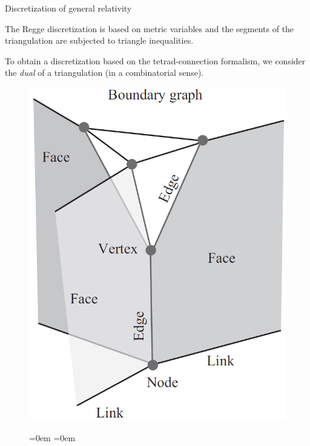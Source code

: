 \documentclass[12pt,titlepage]{article}
\begin{document}
\begin{frame}{Discretization of general relativity}
    \begin{list}{\,}{\leftmargin=1em \itemindent=0em}
        \item<1-> The Regge discretization is based on metric variables and the segments of the triangulation are subjected to triangle inequalities.
        \item<2-> To obtain a discretization based on the tetrad-connection formalism, we consider the \textit{dual} of a triangulation (in a combinatorial sense). 
        \item<3-> \noindent\FloatBarrier
        \begin{figure}[!ht]
            \begin{minipage}{0.3\linewidth}
                \includegraphics[width=\linewidth]{4.6.png}
            \end{minipage}
            \begin{minipage}{0.7\linewidth}
                \begin{itemize}{\leftmargin=0em \itemindent=0em}

\end{itemize}
\end{minipage}
\end{figure}
\end{list}
\end{frame}
\end{document}
